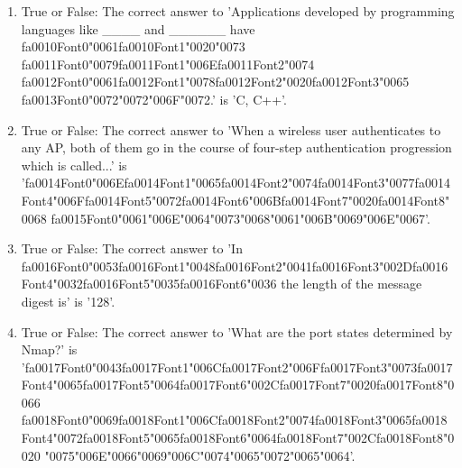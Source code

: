 \documentclass[12pt]{article}
\begin{document}
\begin{enumerate}[label=\arabic*.]
\item True or False: The correct answer to 'Applications developed by programming languages like \_\_\_\_ and \_\_\_\_\_\_ have {\csname fa0010Font0\endcsname\char"0061}{\csname fa0010Font1\endcsname\char"0020}{\char"0073} {\csname fa0011Font0\endcsname\char"0079}{\csname fa0011Font1\endcsname\char"006E}{\csname fa0011Font2\endcsname\char"0074} {\csname fa0012Font0\endcsname\char"0061}{\csname fa0012Font1\endcsname\char"0078}{\csname fa0012Font2\endcsname\char"0020}{\csname fa0012Font3\endcsname\char"0065} {\csname fa0013Font0\endcsname\char"0072}{\char"0072}{\char"006F}{\char"0072}.' is 'C, C++'.
\item True or False: The correct answer to 'When a wireless user authenticates to any AP, both of them go in the course of four-step authentication progression which is called...' is '{\csname fa0014Font0\endcsname\char"006E}{\csname fa0014Font1\endcsname\char"0065}{\csname fa0014Font2\endcsname\char"0074}{\csname fa0014Font3\endcsname\char"0077}{\csname fa0014Font4\endcsname\char"006F}{\csname fa0014Font5\endcsname\char"0072}{\csname fa0014Font6\endcsname\char"006B}{\csname fa0014Font7\endcsname\char"0020}{\csname fa0014Font8\endcsname\char"0068} {\csname fa0015Font0\endcsname\char"0061}{\char"006E}{\char"0064}{\char"0073}{\char"0068}{\char"0061}{\char"006B}{\char"0069}{\char"006E}{\char"0067}'.
\item True or False: The correct answer to 'In {\csname fa0016Font0\endcsname\char"0053}{\csname fa0016Font1\endcsname\char"0048}{\csname fa0016Font2\endcsname\char"0041}{\csname fa0016Font3\endcsname\char"002D}{\csname fa0016Font4\endcsname\char"0032}{\csname fa0016Font5\endcsname\char"0035}{\csname fa0016Font6\endcsname\char"0036} the length of the message digest is' is '128'.
\item True or False: The correct answer to 'What are the port states determined by Nmap?' is '{\csname fa0017Font0\endcsname\char"0043}{\csname fa0017Font1\endcsname\char"006C}{\csname fa0017Font2\endcsname\char"006F}{\csname fa0017Font3\endcsname\char"0073}{\csname fa0017Font4\endcsname\char"0065}{\csname fa0017Font5\endcsname\char"0064}{\csname fa0017Font6\endcsname\char"002C}{\csname fa0017Font7\endcsname\char"0020}{\csname fa0017Font8\endcsname\char"0066} {\csname fa0018Font0\endcsname\char"0069}{\csname fa0018Font1\endcsname\char"006C}{\csname fa0018Font2\endcsname\char"0074}{\csname fa0018Font3\endcsname\char"0065}{\csname fa0018Font4\endcsname\char"0072}{\csname fa0018Font5\endcsname\char"0065}{\csname fa0018Font6\endcsname\char"0064}{\csname fa0018Font7\endcsname\char"002C}{\csname fa0018Font8\endcsname\char"0020} {\char"0075}{\char"006E}{\char"0066}{\char"0069}{\char"006C}{\char"0074}{\char"0065}{\char"0072}{\char"0065}{\char"0064}'.

\end{enumerate}
\end{document}
